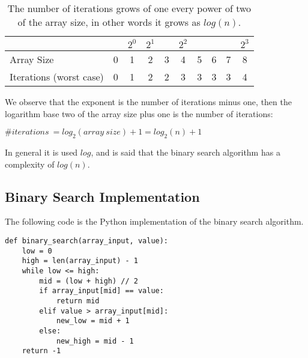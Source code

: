\begin{table}[H]
\caption[Binary search complexity.]{The number of iterations grows of one every power of two of the array size, in other words it grows as \(log(n)\).}
\label{binarysearchefficiency}
\centering
\begin{tabular}{ | l | c | c | c | c | c | c | c | c | c |}
   
    \multicolumn{1}{l}{} & \multicolumn{1}{c}{} & 
    \multicolumn{1}{c}{\(2^{0}\)} & \multicolumn{1}{c}{\(2^{1}\)} &
    \multicolumn{1}{c}{} & \multicolumn{1}{c}{\(2^{2}\)} & 
    \multicolumn{1}{c}{} & \multicolumn{1}{c}{}          & 
    \multicolumn{1}{c}{} & \multicolumn{1}{c}{\(2^{3}\)} \\
    \hline
	Array Size & 0 & \cellcolor{LightCyan} 1 & \cellcolor{LightCyan} 2 & 3 & \cellcolor{LightCyan} 4  & 5 & 6 & 7 & \cellcolor{LightCyan} 8 \\
    \hline
	Iterations (worst case) & 0 & \cellcolor{LightCyan} 1 & \cellcolor{LightCyan} 2 & 2 & \cellcolor{LightCyan} 3 & 3 & 3 & 3 & \cellcolor{LightCyan} 4 \\
	\hline	
\end{tabular}
\end{table}

We observe that the exponent is the number of iterations minus one, then the logarithm base two of the array size plus one is the number of iterations:
\begin{center}
\(\#iterations\ = log_{2}(array\ size) + 1 = log_{2}(n) + 1\)
\end{center}
In general it is used \(log\), and is said that the binary search algorithm has a complexity of \(log(n)\). 

\subsection{Binary Search Implementation}
The following code is the Python implementation of the binary search algorithm.
\begin{lstlisting}[firstnumber=1, caption={Binary search Python implementation.}]
def binary_search(array_input, value):
	low = 0
	high = len(array_input) - 1
	while low <= high:
		mid = (low + high) // 2
		if array_input[mid] == value:
			return mid
		elif value > array_input[mid]:
			new_low = mid + 1
		else:
			new_high = mid - 1
	return -1
\end{lstlisting}

